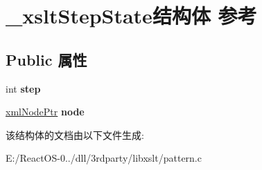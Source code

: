 \hypertarget{struct__xslt_step_state}{}\section{\+\_\+xslt\+Step\+State结构体 参考}
\label{struct__xslt_step_state}
\subsection*{Public 属性}
\begin{DoxyCompactItemize}
\item 
\mbox{\label{struct__xslt_step_state_a438d1ea6013becc3641ba5407b9f4d27}} 
int {\bfseries step}
\item 
\mbox{\label{struct__xslt_step_state_a1f9c88b9ba6c65b6edde405d98511f25}} 
\hyperlink{struct__xml_node}{xml\+Node\+Ptr} {\bfseries node}
\end{DoxyCompactItemize}


该结构体的文档由以下文件生成\+:\begin{DoxyCompactItemize}
\item 
E\+:/\+React\+O\+S-\/0../dll/3rdparty/libxslt/pattern.\+c\end{DoxyCompactItemize}
